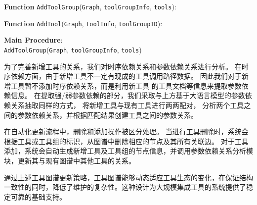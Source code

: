 \begin{algorithm}[!hpt]
\label{alg:add_tool_graph}

\BlankLine
\textbf{Function} \texttt{AddToolGroup}(\texttt{Graph}, \texttt{toolGroupInfo}, \texttt{tools}):\\
\Indp
\Indm
\BlankLine

\textbf{Function} \texttt{AddTool}(\texttt{Graph}, \texttt{toolInfo}, \texttt{toolGroupID}):\\
\Indp
\Indm
\BlankLine

\textbf{Main Procedure}:\\
\Indp
    \texttt{AddToolGroup}(\texttt{Graph}, \texttt{toolGroupInfo}, \texttt{tools})\;
\Indm
\end{algorithm}

为了完善新增工具的关系，我们对时序依赖关系和参数依赖关系进行分析。
在时序依赖方面，由于新增工具不一定有现成的工具调用路径数据。
因此我们对于新增工具暂不添加时序依赖关系，而是利用新工具
的工具文档等信息来提取参数依赖信息。
在提取强/弱参数依赖的部分，我们采取与上方基于大语言模型的参数依赖关系抽取同样的方式，
将新增工具与现有工具进行两两配对，
分析两个工具之间的参数依赖关系，并根据匹配结果创建工具之间的参数关系。

在自动化更新流程中，删除和添加操作被区分处理。
当进行工具删除时，系统会根据工具或工具组的标识，从图谱中删除相应的节点及其所有关联边。
对于工具添加，系统会自动生成新增工具及工具组的节点信息，并调用参数依赖关系分析模块，更新其与现有图谱中其他工具的关系。

通过上述工具图谱更新策略，工具图谱能够动态适应工具生态的变化，在保证结构一致性的同时，降低了维护的复杂性。这种设计为大规模集成工具的系统提供了稳定可靠的基础支持。


